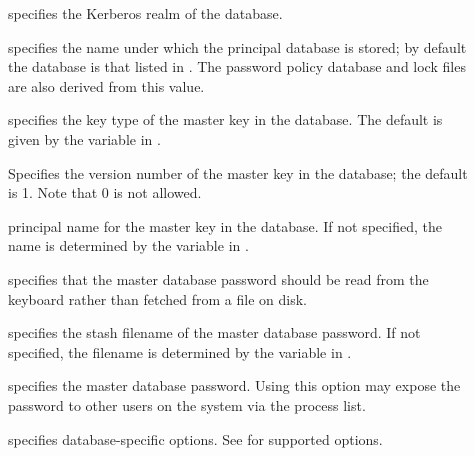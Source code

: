 \documentclass[letterpaper,10pt,english]{sphinxmanual}
\begin{document}
\begin{description}
\item[{ }] \leavevmode
specifies the Kerberos realm of the database.

\item[{ }] \leavevmode
specifies the name under which the principal database is stored;
by default the database is that listed in {\hyperref[\detokenize{admin/conf_files/kdc_conf:kdc-conf-5}]{}}.  The
password policy database and lock files are also derived from this
value.

\item[{ }] \leavevmode
specifies the key type of the master key in the database.  The
default is given by the  variable in
{\hyperref[\detokenize{admin/conf_files/kdc_conf:kdc-conf-5}]{}}.

\item[{ }] \leavevmode
Specifies the version number of the master key in the database;
the default is 1.  Note that 0 is not allowed.

\item[{ }] \leavevmode
principal name for the master key in the database.  If not
specified, the name is determined by the 
variable in {\hyperref[\detokenize{admin/conf_files/kdc_conf:kdc-conf-5}]{}}.

\item[{}] \leavevmode
specifies that the master database password should be read from
the keyboard rather than fetched from a file on disk.

\item[{ }] \leavevmode
specifies the stash filename of the master database password.  If
not specified, the filename is determined by the
 variable in {\hyperref[\detokenize{admin/conf_files/kdc_conf:kdc-conf-5}]{}}.

\item[{ }] \leavevmode
specifies the master database password.  Using this option may
expose the password to other users on the system via the process
list.

\item[{ }] \leavevmode
specifies database-specific options.  See {\hyperref[\detokenize{admin/admin_commands/kadmin_local:kadmin-1}]{}} for
supported options.

\end{description}
\end{document}

